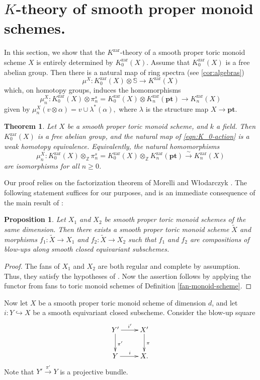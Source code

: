 \documentclass[12pt]{amsart}
\def\Kzar{K^{\mathrm{zar}}}
\newcommand{\Z}{\mathbb{Z}}
\newcommand{\pt}{\mathbf{pt}}
\numberwithin{equation}{section}
\theoremstyle{plain}
\newtheorem{thm}[equation]{Theorem}
\newtheorem{prop}[equation]{Proposition}
\theoremstyle{definition}
\theoremstyle{remark}
\begin{document}
\section{$K$-theory of smooth proper monoid schemes.}\label{sec:K-of-sm-proj}

In this section, we show that the $\Kzar$-theory of a smooth proper
toric monoid scheme $X$ is entirely determined by $\Kzar_0(X)$. Assume
that $\Kzar_0(X)$ is a free abelian group. Then there is a natural map
of ring spectra (see \ref{cor:algebras})
\begin{equation}\label{eqn:K_0-action}
	\mu^X: \Kzar_0(X)\otimes \mathbb{S}\to \Kzar(X)
\end{equation}
which, on homotopy groups, induces the homomorphisms
\[
\mu^X_n: \Kzar_0(X)\otimes \pi^s_n = \Kzar_0(X)\otimes \Kzar_n(\pt) \to \Kzar_n(X)
\]
given by $\mu^X_n(v\otimes\alpha) = v\cup \lambda^*(\alpha),$
where $\lambda$ is the structure map $X\to\pt$.
	
\begin{thm}\label{thm:K-of-sm-proj}
  Let $X$ be a smooth proper toric monoid scheme, and $k$ a field.
  Then $\Kzar_0(X)$ is a free abelian group, and the natural map
  of \eqref{eqn:K_0-action} is a weak homotopy equivalence.
  Equivalently, the natural homomorphisms 
  \[ \mu^X_n: \Kzar_0(X)\otimes_\Z \pi^s_n
  = \Kzar_0(X)\otimes_\Z \Kzar_n(\pt) \xrightarrow{\sim} \Kzar_n(X)
  \]
are isomorphisms for all $n\geq 0$.
\end{thm}

Our proof relies on the factorization theorem of Morelli
\cite{Morelli} and W\l{}odarczyk \cite{Wlodarczyk}. The following
statement suffices for our purposes, and is an immediate consequence
of the main result of \cite{Wlodarczyk}:
	\begin{prop}\label{prop:factorization}
		Let $X_1$ and $X_2$ be smooth proper toric monoid schemes of the same dimension. Then there exists a smooth proper toric monoid scheme $\widetilde{X}$ and morphisms $f_1:\widetilde{X}\to X_1$ and $f_2:\widetilde{X}\to X_2$ such that $f_1$ and $f_2$ are compositions of blow-ups along smooth closed equivariant subschemes. 
	\end{prop}
	
\begin{proof}
The fans of $X_1$ and $X_2$ are both regular and complete by
assumption. Thus, they satisfy the hypotheses of
\cite[Thm.\,A]{Wlodarczyk}. Now the assertion follows by applying the
functor from fans to toric monoid schemes of Definition
\ref{fan-monoid-scheme}.
\end{proof}
Now let $X$ be a smooth proper toric monoid scheme of dimension $d$,
        and let $i:Y\hookrightarrow X$ be a
 smooth equivariant closed subscheme. Consider the blow-up square
\begin{equation}\label{blow-up-square}
	\xymatrix{
		Y'  \ar[r]^{i'}\ar[d]^{\pi'}&
		X' \ar[d]^{\pi} 
		\\
		Y  \ar[r]^{i}& X.
	}
\end{equation}
Note that $Y'\xrightarrow{\pi'} Y$ is a projective bundle. 
	
\end{document}
